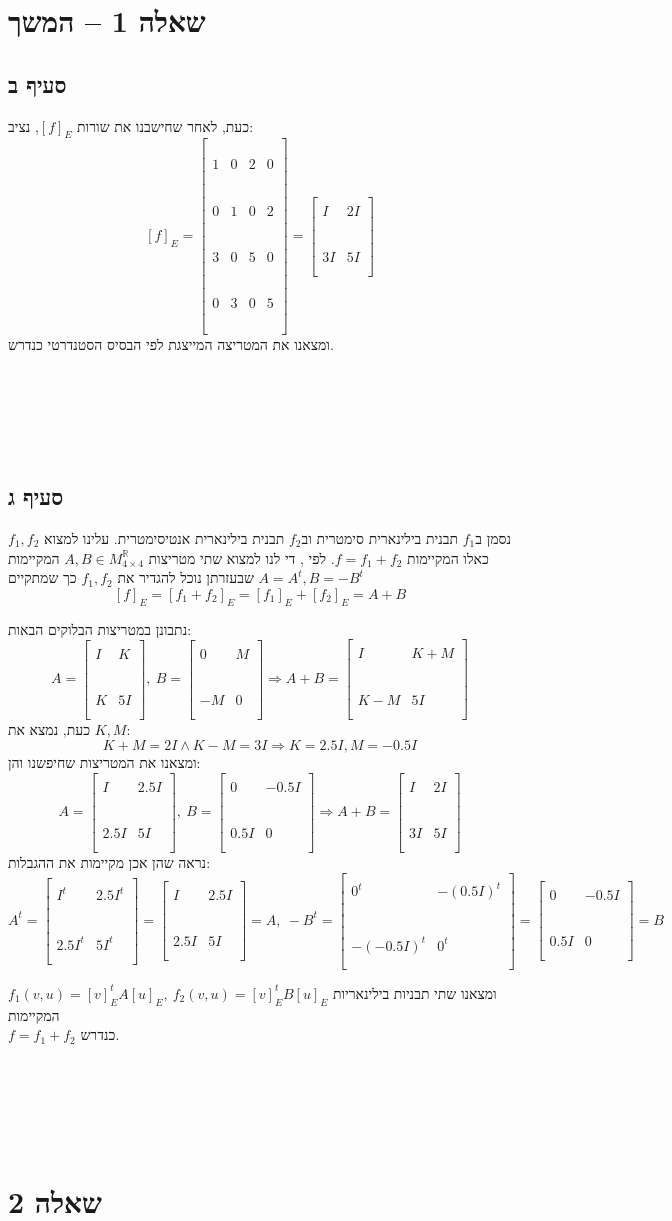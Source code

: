 \documentclass[11pt, oneside]{article}
\newcommand{\qed}{\R{$\blacksquare$}}
\newcommand{\br}{\\\\\\\\\\\\}
\newcommand{\logr}{\Rightarrow}
\newcommand{\mR}{\mathbb{R}}
\newcommand{\ms}[3]{\R{מסקנה #3#2.#1}}
\newcommand{\mfr}[4]{\begin{bmatrix}\\#1 & #2\br #3 & #4\\\\\end{bmatrix}}
\begin{document}
\section*{שאלה 1 -- המשך}
\subsection*{סעיף ב}
כעת, לאחר שחישבנו את שורות $[f]_{E}$, נציב:
\[
[f]_{E} = \begin{bmatrix}\\\\\\
1 & 0 & 2 & 0\br
0 & 1 & 0 & 2\br
3 & 0 & 5 & 0\br
0 & 3 & 0 & 5\\\\\\\\
\end{bmatrix} = \mfr{I}{2I}{3I}{5I}
\]
ומצאנו את המטריצה המייצגת לפי הבסיס הסטנדרטי כנדרש.
\br\qed

\subsection*{סעיף ג}
נסמן ב$f_{1}$ תבנית בילינארית סימטרית וב$f_{2}$ תבנית בילינארית אנטיסימטרית. עלינו למצוא $f_{1}, f_{2}$ כאלו המקיימות $f = f_{1} + f_{2}$. לפי \ms{01}{8}{}, די לנו למצוא שתי מטריצות $A, B \in M^{\mR}_{4\times4}$ המקיימות $A = A^{t}, B = -B^{t}$ שבעזרתן נוכל להגדיר את $f_{1}, f_{2}$ כך שמתקיים
\[
[f]_{E} = [f_{1} + f_{2}]_{E} = [f_{1}]_{E} + [f_{2}]_{E} = A + B
\]

נתבונן במטריצות הבלוקים הבאות:
\[
A = \mfr{I}{K}{K}{5I},\ B = \mfr{0}{M}{-M}{0} \logr A + B = \mfr{I}{K + M}{K - M}{5I}
\]
כעת, נמצא את $K, M$:
\[
K + M = 2I \land K - M = 3I \logr K = 2.5I, M = -0.5I
\]
ומצאנו את המטריצות שחיפשנו והן:
\[
A = \mfr{I}{2.5I}{2.5I}{5I},\ B = \mfr{0}{-0.5I}{0.5I}{0} \logr A + B = \mfr{I}{2I}{3I}{5I}
\]
נראה שהן אכן מקיימות את ההגבלות:
\[
A^{t} = \mfr{I^{t}}{2.5I^{t}}{2.5I^{t}}{5I^{t}} = \mfr{I}{2.5I}{2.5I}{5I} = A,\ -B^{t} = \mfr{0^{t}}{-(0.5I)^{t}}{-(-0.5I)^{t}}{0^{t}} = \mfr{0}{-0.5I}{0.5I}{0} = B
\]

ומצאנו שתי תבניות בילינאריות $f_{1}(v, u) = [v]^{t}_{E}A[u]_{E},\ f_{2}(v, u) = [v]^{t}_{E}B[u]_{E}$ המקיימות\\
 $f = f_{1} + f_{2}$ כנדרש.
\br\qed
\clearpage

\section*{שאלה 2}
\end{document}

